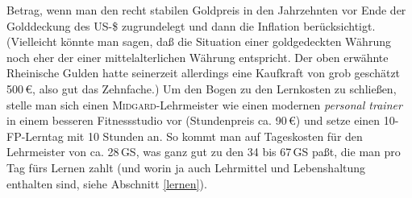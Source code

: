 \documentclass[10pt,a4paper,germanpar]{article}
\begin{document}
Betrag, wenn man den recht stabilen Goldpreis in den Jahrzehnten vor
Ende der Golddeckung des US-\$ zugrundelegt und dann die Inflation
berücksichtigt. (Vielleicht könnte man sagen, daß die Situation einer
goldgedeckten Währung noch eher der einer mittelalterlichen Währung
entspricht. Der oben erwähnte Rheinische Gulden hatte seinerzeit
allerdings eine Kaufkraft von grob geschätzt 500\,\euro, also gut das
Zehnfache.) Um den Bogen zu den Lernkosten zu schließen, stelle man
sich einen \textsc{Midgard}-Lehrmeister wie einen modernen
\emph{personal trainer} in einem besseren Fitnessstudio vor
(Stundenpreis ca. 90\,\euro) und setze einen 10-FP-Lerntag mit 10
Stunden an. So kommt man auf Tageskosten für den Lehrmeister von ca.
28\,GS, was ganz gut zu den 34 bis 67\,GS paßt, die man pro Tag fürs
Lernen zahlt (und worin ja auch Lehrmittel und Lebenshaltung enthalten
sind, siehe Abschnitt \ref{lernen}).
\end{document}
